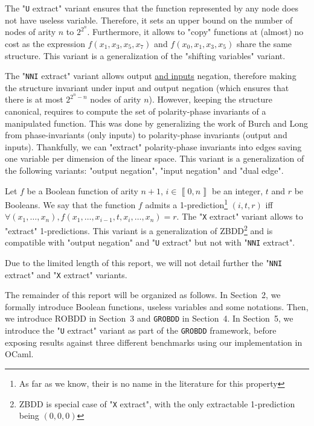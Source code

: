 \documentclass[a4paper,10pt]{article}
\newcommand{\uextract}{"\texttt{U} extract"}
\newcommand{\nniextract}{"\texttt{NNI} extract"}
\newcommand{\xextract}{"\texttt{X} extract"}
\newcommand{\GroBdd}{\texttt{GROBDD}}
\newcommand{\bras}[1]{{\left\llbracket{#1}\right\rrbracket}}
\begin{document}
The \uextract{} variant ensures that the function represented by any node does not have useless variable.
Therefore, it sets an upper bound on the number of nodes of arity $n$ to $2^{2^n}$.
Furthermore, it allows to "copy" functions at (almost) no cost as the expression $f(x_1, x_3, x_5, x_7)$ and $f(x_0, x_1, x_3, x_5)$ share the same structure.
This variant is a generalization of the "shifting variables"\cite{MinatoVariants} variant.


The \nniextract{} variant allows output \underline{and inputs} negation, therefore making the structure invariant under input and output negation (which ensures that there is at most $2^{2^n-n}$ nodes of arity $n$).
However, keeping the structure canonical, requires to compute the set of polarity-phase invariants of a manipulated function.
This was done by generalizing the work of Burch and Long\cite{BurchLong1992} from phase-invariants (only inputs) to polarity-phase invariants (output and inputs).
Thankfully, we can "extract" polarity-phase invariants into edges saving one variable per dimension of the linear space.
This variant is a generalization of the following variants: "output negation"\cite{BryantVariantN}, "input negation"\cite{MinatoVariants} and "dual edge"\cite{RolfVariantDual}.



Let $f$ be a Boolean function of arity $n+1$, $i\in\bras{0, n}$ be an integer, $t$ and $r$ be Booleans.
We say that the function $f$ admits a 1-prediction\footnote{As far as we know, their is no name in the literature for this property} $(i, t, r)$ iff $\forall (x_1, \dots, x_n), f(x_1, \dots, x_{i-1}, t, x_i, \dots, x_n) = r$.
The \xextract{} variant allows to "extract" 1-predictions.
This variant is a generalization of ZBDD\footnote{ZBDD is special case of \xextract{}, with the only extractable 1-prediction being $(0, 0, 0)$} and is compatible with "output negation" and \uextract{} but not with \nniextract{}.

Due to the limited length of this report, we will not detail further the \nniextract{} and \xextract{} variants.

The remainder of this report will be organized as follows.
In Section~2, we formally introduce Boolean functions, useless variables and some notations.
Then, we introduce ROBDD in Section~3 and \GroBdd{} in Section~4.
In Section~5, we introduce the \uextract{} variant as part of the \GroBdd{} framework, before exposing results against three different benchmarks \cite{BenchSatlib, BenchLgsynth91, BenchIscas99} using our implementation in OCaml.
\end{document}
